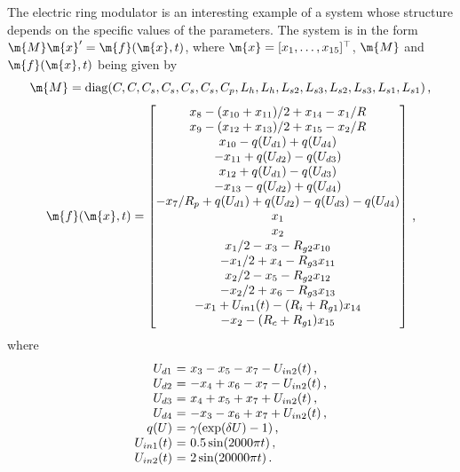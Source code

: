 The electric ring modulator is an interesting example of a system whose structure depends on the specific values of the parameters. The system is in the form $\m{M}\m{x}^\prime = \m{f}(\m{x},t)$, where $\m{x} = [x_1, \dots, x_{15}]^\top$, $\m{M}$ and $\m{f}(\m{x},t)$ being given by
%
\begin{equation*}
  \m{M} = \mathrm{diag}(C, C, C_s, C_s, C_s, C_s, C_p, L_h, L_h, L_{s2}, L_{s3}, L_{s2}, L_{s3}, L_{s1}, L_{s1}) \, \text{,}
\end{equation*}
%
\begin{equation*}
  \m{f}(\m{x},t) = \begin{bmatrix}
    x_8 - (x_{10} + x_{11})/2 + x_{14} - x_1/R \\
    x_9 - (x_{12} + x_{13})/2 + x_{15} - x_2/R \\
    x_{10} - q(U_{d1}) + q(U_{d4}) \\
    -x_{11} + q(U_{d2}) - q(U_{d3}) \\
    x_{12} + q(U_{d1}) - q(U_{d3}) \\
    -x_{13} - q(U_{d2}) + q(U_{d4}) \\
    -x_7/R_p + q(U_{d1}) + q(U_{d2}) - q(U_{d3}) - q(U_{d4}) \\
    x_1 \\
    x_2 \\
    x_1/2 - x_3 - R_{g2}x_{10} \\
    -x_1/2 + x_4 - R_{g3}x_{11} \\
    x_2/2 - x_5 - R_{g2}x_{12} \\
    -x_2/2 + x_6 - R_{g3}x_{13} \\
    -x_1 + U_{in1}(t) - (R_i + R_{g1})x_{14} \\
    -x_2 - (R_c+R_{g1})x_{15}
  \end{bmatrix} \, \text{,}
\end{equation*}
%
where
%
\begin{equation*}
  \begin{array}{r@{~}c@{~}l}
    U_{d1}     &=& x_3 - x_5 - x_7 - U_{in2}(t) \, \text{,} \\
    U_{d2}     &=& -x_4 + x_6 - x_7 - U_{in2}(t) \, \text{,} \\
    U_{d3}     &=& x_4 + x_5 + x_7 + U_{in2}(t) \, \text{,} \\
    U_{d4}     &=& -x_3 - x_6 + x_7 + U_{in2}(t) \, \text{,} \\
    q(U)       &=& \gamma(\exp(\delta U) - 1) \, \text{,} \\
    U_{in1}(t) &=& 0.5 \sin(2000 \pi t) \, \text{,} \\
    U_{in2}(t) &=& 2 \sin(20000 \pi t) \, \text{.}
  \end{array}
\end{equation*}
